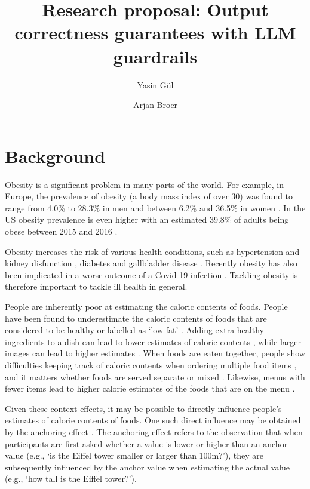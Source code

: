\documentclass[a4paper,doc,natbib]{apa6}
\title{Research proposal: Output correctness guarantees with LLM guardrails}
\author{Yasin G\"{u}l \and Arjan Broer}
\affiliation{Open University of the Netherlands}
\begin{document}
    \maketitle


    \section{Background}

    Obesity is a significant problem in many parts of the world. For example, in Europe, the prevalence of obesity (a body mass index of over 30) was found to range from 4.0\% to 28.3\% in men and between 6.2\% and 36.5\% in women \citep{berghofer2008obesity}. In the US obesity prevalence is even higher with an estimated 39.8\% of adults being obese between 2015 and 2016 \citep{hales2017prevalence}.

    Obesity increases the risk of various health conditions, such as hypertension and kidney disfunction \citep{hall2019obesity}, diabetes \citep{schnurr2020obesity} and gallbladder disease \citep{zahra2019link}. Recently obesity has also been implicated in a worse outcome of a Covid-19 infection \citep{hussain2020obesity}. Tackling obesity is therefore important to tackle ill health in general.

    People are inherently poor at estimating the caloric contents of foods. People have been found to underestimate the caloric contents of foods that are considered to be healthy \citep{chandon2007biasing} or labelled as `low fat' \citep{ebneter2013less}. Adding extra healthy ingredients to a dish can lead to lower estimates of calorie contents \citep{zhu2019extra}, while larger images can lead to higher estimates \citep{tal2021visual}. When foods are eaten together, people show difficulties keeping track of caloric contents when ordering multiple food items \citep{gustafson2019cognitive}, and it matters whether foods are served separate or mixed \citep{ai2021serving}. Likewise, menus with fewer items lead to higher calorie estimates of the foods that are on the menu \citep{kim2022impact}.

    Given these context effects, it may be possible to directly influence people's estimates of calorie contents of foods. One such direct influence may be obtained by the anchoring effect \citep{furnham2011literature,tversky1974judgment}. The anchoring effect refers to the observation that when participants are first asked whether a value is lower or higher than an anchor value (e.g., `is the Eiffel tower smaller or larger than 100m?'), they are subsequently influenced by the anchor value when estimating the actual value (e.g., `how tall is the Eiffel tower?').
\end{document}
